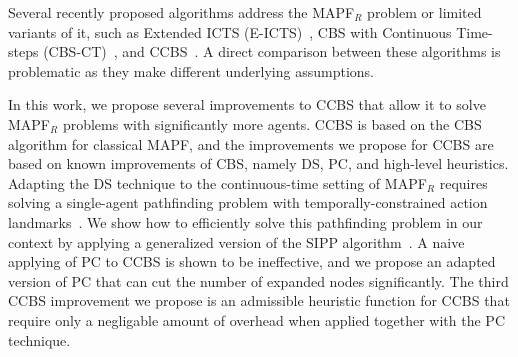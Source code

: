 \documentclass[letterpaper]{article} %
\newcommand\konstantin[1]{\nb{\textbf{Konstantin:}}{red}{#1}}
\newcommand\roni[1]{\nb{\textbf{Roni:}}{orange}{#1}}
\newcommand{\cbs}{\ac{CBS}\xspace}
\newcommand{\ccbs}{\ac{CCBS}\xspace}
\newcommand{\sipp}{\ac{SIPP}\xspace}
\newcommand{\mapfr}{{MAPF}$_R$\xspace}
\newcommand{\mapf}{\ac{MAPF}\xspace}
\newcommand{\pc}{\ac{PC}\xspace}
\newcommand{\ds}{\ac{DS}\xspace}
\begin{document}
Several recently proposed algorithms address the \mapfr problem or limited variants of it, such as Extended ICTS (E-ICTS)~\cite{walker2018extended}, CBS with Continuous Time-steps (CBS-CT)~\cite{cohen2019optimal}, and \ccbs~\cite{andreychuk2019multi}. A direct comparison between these algorithms is problematic as they make different underlying assumptions. 


In this work, we propose several improvements to \ccbs that allow it to solve \mapfr problems with significantly more agents. %
\ccbs is based on the \cbs algorithm for classical \mapf, and the improvements we propose for \ccbs are based on known improvements of \cbs, namely \ds, \pc, and high-level heuristics. 
Adapting the \ds technique to the continuous-time setting of \mapfr requires solving a single-agent pathfinding problem with temporally-constrained action landmarks~\cite{karpas2009cost}. 
We show how to efficiently solve this pathfinding problem in our context by applying a generalized version of the \sipp algorithm~\cite{phillips2011sipp}. 
A naive applying of \pc to \ccbs is shown to be ineffective, and we propose an adapted version of \pc that can cut the number of expanded nodes significantly. 
The third \ccbs improvement we propose is an admissible heuristic function for \ccbs that require only a negligable amount of overhead when applied together with the \pc technique. 
\end{document}
